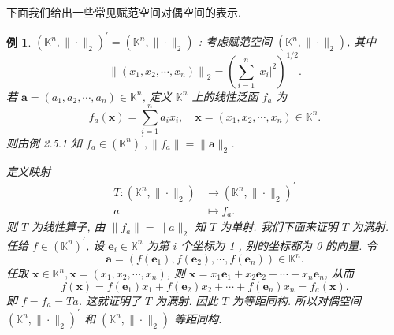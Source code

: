 \documentclass[openany]{ctexbook}
\theoremstyle{kaiti}
\theoremstyle{normal}
\newtheorem{example}{例}[section]
\begin{document}
下面我们给出一些常见赋范空间对偶空间的表示.

\begin{example}
$\left(\mathbb{K}^n,\|\cdot\|_2\right)^{\prime}=\left(\mathbb{K}^n,\|\cdot\|_2\right)$ : 考虑赋范空间 $\left(\mathbb{K}^n,\|\cdot\|_2\right)$, 其中
$$
\left\|\left(x_1, x_2, \cdots, x_n\right)\right\|_2=\left(\sum_{i=1}^n\left|x_{i}\right|^2\right)^{1 / 2}.
$$
若 $\boldsymbol{a}=\left(a_1, a_2, \cdots, a_n\right) \in \mathbb{K}^n$, 定义 $\mathbb{K}^n$ 上的线性泛函 $f_{a}$ 为
$$
f_{a}(\boldsymbol{x})=\sum_{i=1}^n a_{i} x_{i}, \quad \boldsymbol{x}=\left(x_1, x_2, \cdots, x_n\right) \in \mathbb{K}^n.
$$
则由例 2.5.1 知 $f_{a} \in\left(\mathbb{K}^n\right)^{\prime},\left\|f_{a}\right\|=\|\boldsymbol{a}\|_2$.

定义映射
$$
\begin{aligned}
T:\left(\mathbb{K}^n,\|\cdot\|_2\right) & \rightarrow\left(\mathbb{K}^n,\|\cdot\|_2\right)^{\prime} \\
a & \mapsto f_{a}.
\end{aligned}
$$
则 $T$ 为线性算子, 由 $\left\|f_{a}\right\|=\|a\|_2$ 知 $T$ 为单射. 我们下面来证明 $T$ 为满射. 任给 $f \in\left(\mathbb{K}^n\right)^{\prime}$, 设 $\boldsymbol{e}_{i} \in \mathbb{K}^n$ 为第 $i$ 个坐标为 1 , 别的坐标都为 0 的向量. 令
$$
\boldsymbol{a}=\left(f\left(\boldsymbol{e}_1\right), f\left(\boldsymbol{e}_2\right), \cdots, f\left(\boldsymbol{e}_n\right)\right) \in \mathbb{K}^n.
$$
任取 $\boldsymbol{x} \in \mathbb{K}^n, \boldsymbol{x}=\left(x_1, x_2, \cdots, x_n\right)$, 则 $\boldsymbol{x}=x_1 \boldsymbol{e}_1+x_2 \boldsymbol{e}_2+\cdots+x_n \boldsymbol{e}_n$, 从而
$$
f(\boldsymbol{x})=f\left(\boldsymbol{e}_1\right) x_1+f\left(\boldsymbol{e}_2\right) x_2+\cdots+f\left(\boldsymbol{e}_n\right) x_n=f_{a}(\boldsymbol{x}).
$$
即 $f=f_{a}=T a$. 这就证明了 $T$ 为满射. 因此 $T$ 为等距同构. 所以对偶空间 $\left(\mathbb{K}^n,\|\cdot\|_2\right)^{\prime}$ 和 $\left(\mathbb{K}^n,\|\cdot\|_2\right)$ 等距同构.
\end{example}
\end{document}
